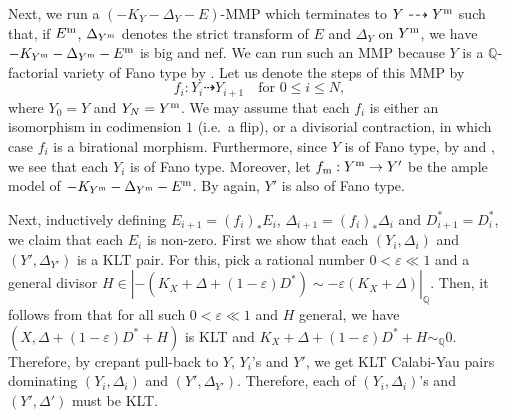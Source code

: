 \documentclass[11pt,reqno]{amsart}
\newcommand{\Q}{\mathbb{Q}}
\numberwithin{equation}{section}
\theoremstyle{definition}
\begin{document}
Next, we run a $(-K_Y-\Delta_Y-E)$-MMP which terminates to $Y\dashrightarrow Y^{\rm m}$ such that, if $E^{\rm m} $, $\Delta_{Y^{\rm m}}$ denotes the strict transform of $E$ and $\Delta_Y$ on $Y^{\rm m}$, we have $-K_{Y^{\rm m}} -\Delta_{Y^{\rm m}} -E^{\rm m}$ is big and nef. We can run such an MMP because $Y$ is a $\Q$-factorial variety of Fano type by \cite[Lemma 3.2]{BLX22}. Let us denote the steps of this MMP by
\[ f_i : Y_i \dashrightarrow Y_{i+1} \quad \text{for $0 \leq i \leq N$},\]
 where $Y_0 = Y$ and $Y_N = Y^{\rm m}$. We may assume that each $f_i$ is either an isomorphism in codimension $1$ (i.e.\ a flip), or  a divisorial contraction, in which case $f_i$ is a birational morphism. Furthermore, since $Y$ is of Fano type, by \cite[Lemma~2.12]{BirkarAntipluricanonicalsystems} and , we see that each $Y_i$ is of Fano type. 
 Moreover, let $f_{\rm m}: Y^{\rm m} \to Y'$ be the ample model of $-K_{Y^{\rm m}} - \Delta_{Y^{\rm m}} - E^{\rm m}$. By \cite[Lemma~2.12]{BirkarAntipluricanonicalsystems} again, $Y'$ is also of Fano type.

Next, inductively defining $E_{i+1} = (f_i)_* E_i$, $\Delta_{i+1} = (f_i)_* \Delta_i$ and $D_{i+1} ^* = D_{i} ^* $, we claim that each $E_i$ is non-zero. First we show that each $(Y_i, \Delta_i)$ and $(Y' , \Delta_{Y'})$ is a KLT pair. For this, pick a rational number $ 0 <\varepsilon \ll 1$ and a general divisor $H \in | - (K_X + \Delta + (1 - \varepsilon) D^*) \sim -\varepsilon (K_X + \Delta)|_\Q$. Then, it follows from  that for all such $0 < \varepsilon \ll 1$ and $H$ general, we have $(X, \Delta + (1 - \varepsilon) D^* + H)$ is KLT and $K_X + \Delta + (1 - \varepsilon) D^* + H \sim _\Q 0 $. Therefore, by crepant pull-back to $Y$, $Y_i$'s and $Y'$, we get KLT Calabi-Yau pairs dominating $(Y_i, \Delta_i)$ and $(Y', \Delta_{Y'})$. Therefore, each of $(Y_i, \Delta_i)$'s and $(Y', \Delta')$ must be KLT.
\end{document}
